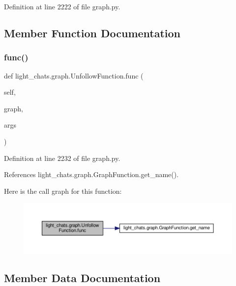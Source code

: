 Definition at line 2222 of file graph.\+py.



\subsection{Member Function Documentation}
\mbox{\label{classlight__chats_1_1graph_1_1UnfollowFunction_a09b37c0a471f8dd65216e434a98983af}} 
\subsubsection{\texorpdfstring{func()}{func()}}
{\footnotesize\ttfamily def light\+\_\+chats.\+graph.\+Unfollow\+Function.\+func (\begin{DoxyParamCaption}\item[{}]{self,  }\item[{}]{graph,  }\item[{}]{args }\end{DoxyParamCaption})}



Definition at line 2232 of file graph.\+py.



References light\+\_\+chats.\+graph.\+Graph\+Function.\+get\+\_\+name().

Here is the call graph for this function\+:
\nopagebreak
\begin{figure}[H]
\begin{center}
\leavevmode
\includegraphics[width=350pt]{classlight__chats_1_1graph_1_1UnfollowFunction_a09b37c0a471f8dd65216e434a98983af_cgraph}
\end{center}
\end{figure}


\subsection{Member Data Documentation}
\mbox{\label{classlight__chats_1_1graph_1_1UnfollowFunction_a9b7464a052add385de3d685e1627fcf5}} 
